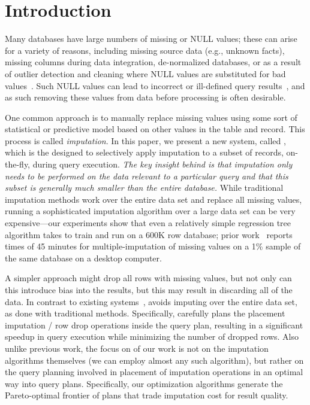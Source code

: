 \section{Introduction}

Many databases have large numbers of missing or NULL values;  these can arise for a variety of reasons, including missing source data (e.g., unknown facts),
missing columns during data integration, de-normalized databases, or as a result of outlier detection and cleaning where NULL values are substituted for
bad values~\cite{kim2003}.  Such NULL values can lead to incorrect or ill-defined query results~\cite{rubin1976}, and as such removing these values from data
before processing is often desirable.

One common approach is to manually replace missing values using some sort of statistical or predictive model based on other values in the table and record.
This process is called \emph{imputation}.
In this paper, we present a new system, called \ProjectName{}, which is the designed to selectively apply imputation to a subset of records, on-the-fly, during query execution.  \emph{The key insight behind \ProjectName{} is that imputation
only needs to be performed on the data relevant to a particular query and
that this subset is generally much smaller than the entire database.}  
While traditional imputation methods work over the entire data set and replace all missing values, running a sophisticated imputation algorithm over a large data set can be very expensive---our experiments show that even a relatively simple regression tree algorithm takes \acsbaseresulthours{} to train and run
on a 600K row database; prior work~\cite{akande2015empirical} reports times of 45 minutes for multiple-imputation of missing values on a 1\% sample of the same database on a desktop computer.

A simpler approach might drop all rows with missing values, but not only can this introduce bias into the results, but this may result in discarding all of the data.
In contrast to existing systems~\cite{burgette2010multiple,akande2015empirical}, \ProjectName{} avoids imputing over the entire data set, as done with traditional methods. Specifically, \ProjectName{}
carefully plans the placement  imputation / row drop operations inside the query plan, resulting in a 
significant speedup in query execution while minimizing the number of dropped rows.  Also unlike previous work, the focus on of our work is not on the imputation algorithms themselves (we can employ almost any such algorithm), but rather on the  query planning involved in placement of imputation operations
in an optimal way into query plans.   Specifically, our optimization algorithms generate the Pareto-optimal frontier of plans that trade imputation cost for result quality.

